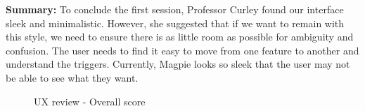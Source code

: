 \textbf{Summary: }
To conclude the first session, Professor Curley found our interface sleek and minimalistic. However, she suggested that if we want to remain with this style, we need to ensure there is as little room as possible for ambiguity and confusion. The user needs to find it easy to move from one feature to another and understand the triggers. Currently, Magpie looks so sleek that the user may not be able to see what they want.
\begin{figure}
    \centering
    \caption{UX review - Overall score}
\end{figure}

\newpage
